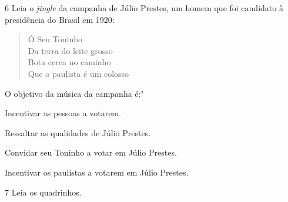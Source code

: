 \num{6} Leia o \emph{jingle} da campanha de Júlio Prestes, um homem que
foi candidato à presidência do Brasil em 1920:

\begin{verse}
Ó Seu Toninho\\
Da terra do leite grosso\\
Bota cerca no caminho\\
Que o paulista é um colosso
\end{verse}

\noindent O objetivo da música da campanha é:"

\begin{escolha}
\item Incentivar as pessoas a votarem.
\item Ressaltar as qualidades de Júlio Prestes.
\item Convidar seu Toninho a votar em Júlio Prestes.
\item Incentivar os paulistas a votarem em Júlio Prestes.
\end{escolha}



\num{7} Leia os quadrinhos.

